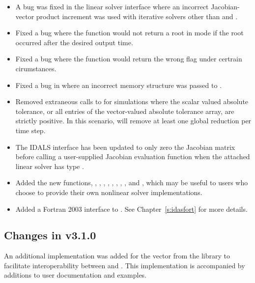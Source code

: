 \begin{itemize}
\item A bug was fixed in the {\idas} linear solver interface where an incorrect
Jacobian-vector product increment was used with iterative solvers other than
{\sunlinsolspgmr} and {\sunlinsolspfgmr}.
%
\item Fixed a bug where the  function would not return a root in
 mode if the root occurred after the desired output time.
%
\item Fixed a bug where the  function would return the wrong flag
under certrain cirumstances.
%
\item Fixed a bug in  where an incorrect memory structure was
passed to .
%
\item Removed extraneous calls to  for simulations where the scalar
valued absolute tolerance, or all entries of the vector-valued absolute
tolerance array, are strictly positive. In this scenario, {\idas} will remove at
least one global reduction per time step.
%
\item The IDALS interface has been updated to only zero the Jacobian matrix
before calling a user-supplied Jacobian evaluation function when the attached
linear solver has type \newline\noindent
{}.
%
\item Added the new functions,
,
,
, \newline\noindent
{},
,
,
,
,
and ,
which may be useful to users who choose to provide their own nonlinear solver
implementations.
%
\item Added a Fortran 2003 interface to {\idas}. See Chapter~\ref{s:idasfort} for
more details.
\end{itemize}



\subsection*{Changes in v3.1.0}

An additional {\nvector} implementation was added for the
{\tpetra} vector from the {\trilinos} library to facilitate interoperability
between {\sundials} and {\trilinos}. This implementation is accompanied by
additions to user documentation and {\sundials} examples.

